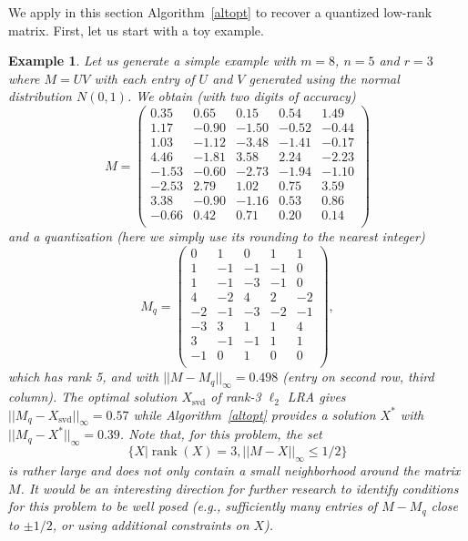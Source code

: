 \documentclass[a4paper,11pt]{article}
\newtheorem{example}{Example}
\numberwithin{equation}{section}
\DeclareMathOperator{\rank}{rank}
\begin{document}
We apply in this section Algorithm~\ref{altopt} to recover a quantized low-rank matrix. First, let us start with a toy example. 
\begin{example} \label{ex3}
Let us generate a simple example with $m = 8$, $n = 5$ and $r = 3$ where $M = UV$ with each entry of $U$ and $V$ generated using the normal distribution $N(0,1)$. We obtain (with two digits of accuracy)
\[
M = 
\left( \begin{array}{cccccccc} 
 0.35 &  0.65 &  0.15 &  0.54 &  1.49 \\ 
 1.17 &  -0.90 &  -1.50 &  -0.52 &  -0.44 \\ 
 1.03 &  -1.12 &  -3.48 &  -1.41 &  -0.17 \\ 
 4.46 &  -1.81 &  3.58 &  2.24 &  -2.23 \\ 
 -1.53 &  -0.60 &  -2.73 &  -1.94 &  -1.10 \\ 
 -2.53 &  2.79 &  1.02 &  0.75 &  3.59 \\ 
 3.38 &  -0.90 &  -1.16 &  0.53 &  0.86 \\ 
 -0.66 &  0.42 &  0.71 &  0.20 &  0.14 \\ 
\end{array} \right)  
\]
and a quantization (here we simply use its rounding to the nearest integer)   
\[
M_q = 
\left( \begin{array}{cccccccc} 
  0 &   1 &   0 &   1 &   1 \\ 
  1 &  -1 &  -1 &  -1 &  0 \\ 
  1 &  -1 &  -3 &  -1 &  0 \\ 
  4 &  -2 &   4 &   2 &  -2 \\ 
 -2 &  -1 &  -3 &  -2 &  -1 \\ 
 -3 &   3 &   1 &   1 &   4 \\ 
  3 &  -1 &  -1 &   1 &   1 \\ 
 -1 &   0 &   1 &   0 &   0 \\ 
\end{array} \right) , 
\]
which has rank 5, and with $||M - M_q||_{\infty} = 0.498$ (entry on second row, third column).  
The optimal solution $X_{\text{svd}}$ of rank-3 $\ell_2$ LRA gives $||M_q-X_{\text{svd}}||_{\infty} = 0.57$ 
while Algorithm~\ref{altopt} provides a solution $X^*$ with $||M_q-X^*||_{\infty} = 0.39$. Note that, for this problem, 
the set 
\[
\{ X | \rank(X) = 3, ||M-X||_\infty \leq 1/2\}
\] 
is rather large and does not only contain a small neighborhood around the matrix $M$. 
It would be an interesting direction for further research to identify conditions for this problem to be well posed 
(e.g., sufficiently many entries of $M-M_q$ close to $\pm 1/2$, or using additional constraints on $X$). 
\end{example} 
\end{document}
